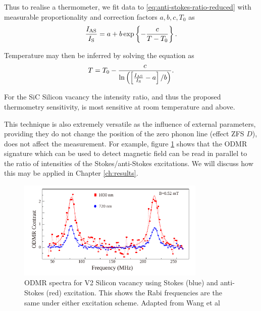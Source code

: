 Thus to realise a thermometer, we fit data to \eqref{eq:anti-stokes-ratio-reduced} with measurable proportionality and correction factors $a, b, c, T_0$ as \cite{Tran2019}
\begin{equation}
	\frac{I_{\ce{AS}}}{I_{\ce{S}}} = a +  b\exp\left\{-\frac{c}{T - T_0} \right\}.
	\label{eq:s1.5thermo_exponential}
\end{equation}

Temperature may then be inferred by solving the equation as
\begin{equation}
	T = T_0 - \frac{c}{\ln\left(\left[{\frac{I_{\ce{AS}}}{I_{\ce{S}}} - a}\right]/b\right)}.
	\label{eq:anti-stokes-solution}
\end{equation}

For the SiC Silicon vacancy the intensity ratio, and thus the proposed thermometry sensitivity, is most sensitive at room temperature and above.

This technique is also extremely versatile as the influence of external parameters, providing they do not change the position of the zero phonon line (effect ZFS $D$), does not affect the measurement. For example, figure \ref{fig:anti-stokes-ODMR} shows that the ODMR signature which can be used to detect magnetic field can be read in parallel to the ratio of intensities of the Stokes/anti-Stokes excitations. We will discuss how this may be applied in Chapter \ref{ch:results}.



\begin{figure}[h]
	\centering
	\includegraphics[width=0.8\textwidth]{figures/anti-stokes-ODMR.pdf}
	\caption{ODMR spectra for V2 Silicon vacancy using Stokes (blue) and anti-Stokes (red) excitation. This shows the Rabi frequencies are the same under either excitation scheme. Adapted from Wang et al}
    \label{fig:anti-stokes-ODMR}
\end{figure}



